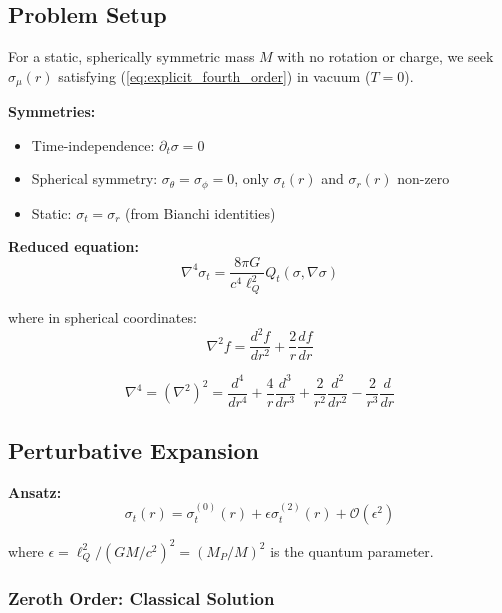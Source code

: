 \documentclass[11pt,a4paper]{article}
\theoremstyle{definition}
\theoremstyle{remark}
\begin{document}
	\subsection{Problem Setup}
	
	For a static, spherically symmetric mass $M$ with no rotation or charge, we seek $\sigma_\mu(r)$ satisfying (\ref{eq:explicit_fourth_order}) in vacuum ($T = 0$).
	
	\textbf{Symmetries:}
	\begin{itemize}
		\item Time-independence: $\partial_t\sigma = 0$
		\item Spherical symmetry: $\sigma_\theta = \sigma_\phi = 0$, only $\sigma_t(r)$ and $\sigma_r(r)$ non-zero
		\item Static: $\sigma_t = \sigma_r$ (from Bianchi identities)
	\end{itemize}
	
	\textbf{Reduced equation:}
	\begin{equation}\label{eq:schwarz_equation}
		\nabla^4\sigma_t = \frac{8\pi G}{c^4\ell_Q^2}Q_t(\sigma, \nabla\sigma)
	\end{equation}
	
	where in spherical coordinates:
	\begin{equation}
		\nabla^2 f = \frac{d^2f}{dr^2} + \frac{2}{r}\frac{df}{dr}
	\end{equation}
	
	\begin{equation}
		\nabla^4 = (\nabla^2)^2 = \frac{d^4}{dr^4} + \frac{4}{r}\frac{d^3}{dr^3} + \frac{2}{r^2}\frac{d^2}{dr^2} - \frac{2}{r^3}\frac{d}{dr}
	\end{equation}
	
	\subsection{Perturbative Expansion}
	
	\textbf{Ansatz:}
	\begin{equation}
		\sigma_t(r) = \sigma_t^{(0)}(r) + \epsilon\sigma_t^{(2)}(r) + \mathcal{O}(\epsilon^2)
	\end{equation}
	
	where $\epsilon = \ell_Q^2/(GM/c^2)^2 = (M_P/M)^2$ is the quantum parameter.
	
	\subsubsection{Zeroth Order: Classical Solution}
	
\end{document}
